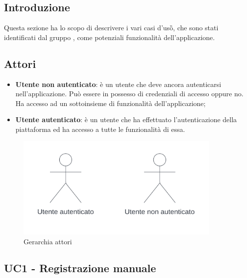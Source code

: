 \subsection{Introduzione}
Questa sezione ha lo scopo di descrivere i vari casi d'uso\G{}, che sono stati identificati dal gruppo \teamname{}, come potenziali funzionalità dell'applicazione.

\subsection{Attori}
\begin{itemize}
    \item \textbf{Utente non autenticato}: 
    è un utente che deve ancora autenticarsi nell'applicazione. Può essere in possesso di credenziali di accesso oppure no. Ha accesso ad un sottoinsieme di funzionalità dell'applicazione;
    \item \textbf{Utente autenticato}:
    è un utente che ha effettuato l'autenticazione della piattaforma ed ha accesso a tutte le funzionalità di essa.
\end{itemize}

\begin{figure}[!h]
    \includegraphics[width=10cm]{sezioni/Images/Actors.png}
    \centering
    \caption{Gerarchia attori}
\end{figure}
\newpage
    
\subsection{UC1 - Registrazione manuale}

